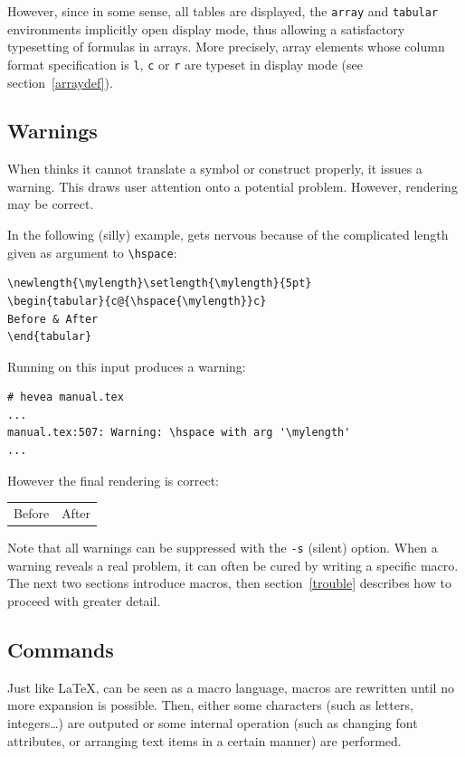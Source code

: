 However, since in some sense, all \html{} tables are displayed, the
\verb+array+ and \verb+tabular+ environments implicitly open display
mode, thus allowing a satisfactory typesetting of formulas in
arrays. More precisely, array elements whose column format
specification is \verb+l+, \verb+c+ or \verb+r+ are typeset in display
mode (see section~\ref{arraydef}).


\subsection{Warnings}
When \hevea{} thinks it cannot translate a symbol or construct
properly, it issues a warning. This draws user attention onto a
potential problem. However, rendering may be correct.

\begin{htmlonly}
In the following (silly) example, \hevea{} gets nervous  because of
the complicated length given as argument to \verb+\hspace+:
\begin{verbatim}
\newlength{\mylength}\setlength{\mylength}{5pt}
\begin{tabular}{c@{\hspace{\mylength}}c}
Before & After
\end{tabular}
\end{verbatim}
Running \hevea{} on this input produces a warning:
\begin{verbatim}
# hevea manual.tex
...
manual.tex:507: Warning: \hspace with arg '\mylength'
...
\end{verbatim}
However the final rendering is correct:
\begin{htmlout}
\newlength{\mylength}\setlength{\mylength}{5pt}
\begin{tabular}{c@{\hspace{\mylength}}c}
Before & After
\end{tabular}
\end{htmlout}
\end{htmlonly}

Note that all warnings can be suppressed with the \verb+-s+ (silent)
option.
When a warning reveals a real problem, it can often be cured by
writing a specific macro. The next two sections introduce \hevea{}
macros, then section~\ref{trouble} describes how to proceed with
greater detail.

\subsection{Commands}
Just like \LaTeX{}, \hevea{} can be seen as a macro language, macros
are rewritten until no more expansion is possible. Then, either some
characters (such as letters, integers\ldots) are outputed or some
internal operation (such as changing font attributes, or arranging
text items in a certain manner) are performed.

